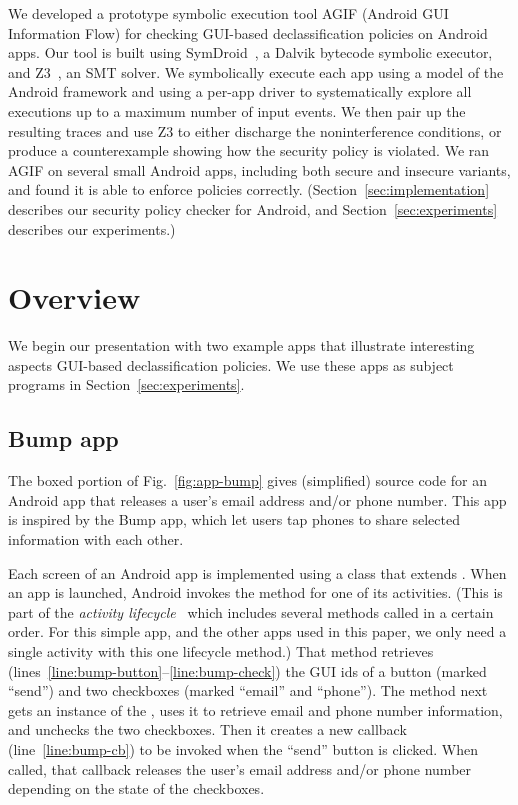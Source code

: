 \documentclass[10pt,conference,compsocconf]{IEEEtran}
\newcommand{\code}[1]{\text{\lstinline!#1!}}
\newcommand{\toolname}{AGIF\xspace}
\begin{document}
We developed a prototype symbolic execution tool \toolname{} (Android
GUI Information Flow)
for checking GUI-based declassification policies on
Android apps. Our tool is built using SymDroid~\cite{Jeon:2012}, a Dalvik
bytecode symbolic executor, and Z3~\cite{deMoura:2008}, an SMT solver. We
symbolically execute each app using a model of the Android framework
and using a per-app driver to systematically explore all executions up
to a maximum number of input events. We then pair up the resulting
traces and use Z3 to either discharge the noninterference conditions,
or produce a counterexample showing how the security policy is
violated.  
We ran \toolname{} on several small Android apps, including both
secure and insecure variants, and found it is able to enforce policies
correctly. (Section~\ref{sec:implementation} describes our security
policy checker for Android, and Section~\ref{sec:experiments}
describes our experiments.)

\section{Overview}
\label{sec:overview}

We begin our presentation with two example apps that illustrate
interesting aspects GUI-based declassification policies. We use these
apps as subject programs in Section~\ref{sec:experiments}.

\subsection{Bump app}
The boxed portion of Fig.~\ref{fig:app-bump} gives (simplified)
source code for an Android app that releases a user's email address
and/or phone number. This app is inspired by the Bump app, which
let users tap phones to share selected information with each other.

Each screen of an Android app is implemented using a class that
extends \code{Activity}. When an app is launched, Android invokes the
\code{onCreate} method for one of its activities.
(This is part of the \emph{activity lifecycle}~\cite{AndroidLifecycle}
which includes several methods called in a certain order. For this
simple app, and the other apps used in this paper, we only need a
single activity with this one lifecycle method.)
That method retrieves
(lines~\ref{line:bump-button}--\ref{line:bump-check}) the GUI ids of a
button (marked ``send'') and
two checkboxes (marked ``email'' and ``phone''). The \code{onCreate} method next
gets an instance of the \code{TelephonyManager}, uses it
to retrieve email and phone number information, and unchecks the two
checkboxes. Then it creates a new callback
(line~\ref{line:bump-cb}) to be invoked when the ``send'' button is
clicked. When called, that callback releases the user's email address and/or
phone number depending on the state of the checkboxes.
\end{document}
